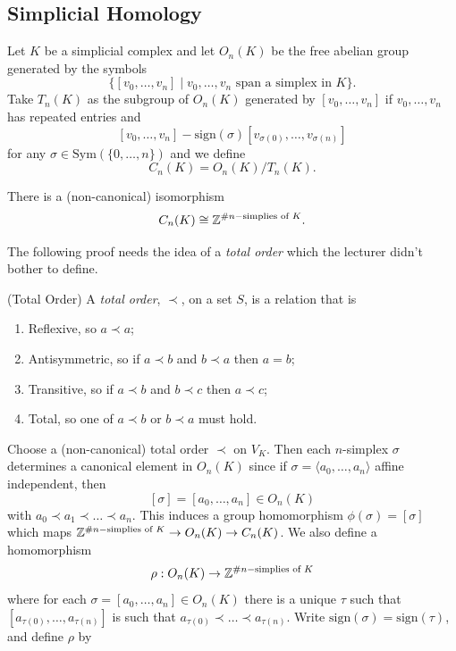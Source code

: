 \documentclass{article}
\begin{document}
\subsection{Simplicial Homology}
\begin{definition}
	Let $ K $ be a simplicial complex and let $ O_n(K) $ be the free abelian group generated by the symbols
	\[
		\{[v_0,\dots, v_n]\mid v_0,\dots, v_n \text{ span a simplex in } K\}.
	\]
	Take $ T_n(K) $ as the subgroup of $ O_n(K) $ generated by $ [v_0,\dots, v_n] $ if $ v_0,\dots, v_n $ has repeated entries and
	\[
		[v_0,\dots, v_n] - \mathrm{sign}(\sigma)[v_{\sigma(0)}, \dots, v_{\sigma(n)}] 
	\]
	for any $ \sigma\in \mathrm{Sym}(\{0,\dots, n\}) $ and we define
	\[
	  C_n(K) = O_n(K)/T_n(K).
	\]
\end{definition}
\begin{lemma}
  There is a (non-canonical) isomorphism
  \[
	  C_n(K) \cong \mathbb{Z}^{\# n-\text{simplies of } K}.
  \]
\end{lemma}
\pf The following proof needs the idea of a \textit{total order} which the lecturer didn't bother to define.
\begin{definition}
	(Total Order) A \textit{total order}, $ \prec $, on a set $ S $, is a relation that is
	\begin{enumerate}
		\item Reflexive, so $ a\prec a $;
		\item Antisymmetric, so if $ a\prec b $ and $ b\prec a $ then $ a = b $;
		\item Transitive, so if $ a\prec b $ and $ b\prec c $ then $ a\prec c $;
		\item Total, so one of $ a\prec b $ or $ b\prec a $ must hold.
	\end{enumerate}
\end{definition}
Choose a (non-canonical) total order $ \prec $ on $ V_K $. Then each $ n $-simplex $ \sigma $ determines a canonical element in $ O_n(K) $ since if $ \sigma = \langle a_0,\dots, a_n\rangle $ affine independent, then 
\[
	[\sigma] = [a_0,\dots, a_n]\in O_n(K)
\]
with $ a_0 \prec a_1\prec \dots \prec a_n $. This induces a group homomorphism $ \phi(\sigma) = [\sigma] $ which maps $ \mathbb{Z}^{\# n-\text{simplies of } K} \to O_n(K) \to C_n(K) $. We also define a homomorphism 
\[
  \rho: O_n(K) \to  \mathbb{Z}^{\# n-\text{simplies of } K}  
\]
where for each $ \sigma = [a_0,\dots, a_n] \in O_n(K) $ there is a unique $ \tau $ such that $ [a_{\tau(0)},\dots, a_{\tau(n)}] $ is such that $ a_{\tau(0)} \prec \dots \prec a_{\tau(n)} $. Write $ \mathrm{sign}(\sigma) = \mathrm{sign}(\tau) $, and define $ \rho $ by
\end{document}
